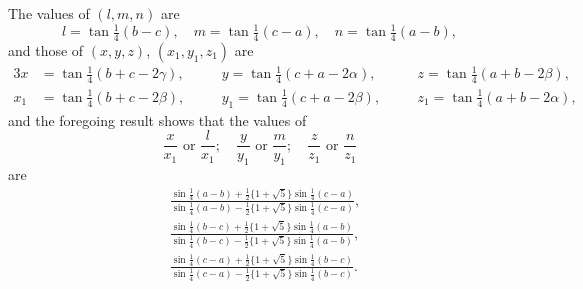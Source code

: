 \documentclass[11pt,a4paper]{article}
\theoremstyle{plain}
\begin{document}
The values of $(l, m, n)$ are
\[
l = \tan\tfrac{1}{4}(b - c),\quad m = \tan\tfrac{1}{4}(c - a),\quad n = \tan\tfrac{1}{4}(a - b),
\]
and those of $(x, y, z)$, $(x_1, y_1, z_1)$ are
\begin{alignat*}{3}
x &= \tan\tfrac{1}{4}(b + c - 2\gamma), &\quad& y = \tan\tfrac{1}{4}(c + a - 2\alpha), &\quad& z = \tan\tfrac{1}{4}(a + b - 2\beta),\\
x_1 &= \tan\tfrac{1}{4}(b + c - 2\beta), &\quad& y_1 = \tan\tfrac{1}{4}(c + a - 2\beta), &\quad& z_1 = \tan\tfrac{1}{4}(a + b - 2\alpha),
\end{alignat*}
and the foregoing result shows that the values of
\[
\frac{x}{x_1}\text{ or }\frac{l}{x_1};\quad \frac{y}{y_1}\text{ or }\frac{m}{y_1};\quad \frac{z}{z_1}\text{ or }\frac{n}{z_1}
\]
are
\begin{align*}
&\frac{\sin\tfrac{1}{4}(a - b) + \tfrac{1}{2}\{1 + \sqrt{5}\}\sin\tfrac{1}{4}(c - a)}{\sin\tfrac{1}{4}(a - b) - \tfrac{1}{2}\{1 + \sqrt{5}\}\sin\tfrac{1}{4}(c - a)},\\
&\frac{\sin\tfrac{1}{4}(b - c) + \tfrac{1}{2}\{1 + \sqrt{5}\}\sin\tfrac{1}{4}(a - b)}{\sin\tfrac{1}{4}(b - c) - \tfrac{1}{2}\{1 + \sqrt{5}\}\sin\tfrac{1}{4}(a - b)},\\
&\frac{\sin\tfrac{1}{4}(c - a) + \tfrac{1}{2}\{1 + \sqrt{5}\}\sin\tfrac{1}{4}(b - c)}{\sin\tfrac{1}{4}(c - a) - \tfrac{1}{2}\{1 + \sqrt{5}\}\sin\tfrac{1}{4}(b - c)}.
\end{align*}
\end{document}

